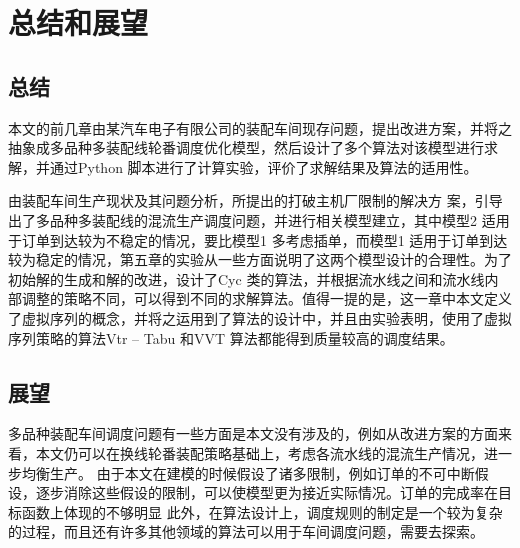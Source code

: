 \chapter{总结和展望}

\section{总结}
本文的前几章由某汽车电子有限公司的装配车间现存问题，提出改进方案，并将之抽象成多品种多装配线轮番调度优化模型，然后设计了多个算法对该模型进行求解，并通过Python 脚本进行了计算实验，评价了求解结果及算法的适用性。

由装配车间生产现状及其问题分析，所提出的打破主机厂限制的解决方
案，引导出了多品种多装配线的混流生产调度问题，并进行相关模型建立，其中模型2 适用于订单到达较为不稳定的情况，要比模型1 多考虑插单，而模型1 适用于订单到达较为稳定的情况，第五章的实验从一些方面说明了这两个模型设计的合理性。为了初始解的生成和解的改进，设计了Cyc 类的算法，并根据流水线之间和流水线内部调整的策略不同，可以得到不同的求解算法。值得一提的是，这一章中本文定义了虚拟序列的概念，并将之运用到了算法的设计中，并且由实验表明，使用了虚拟序列策略的算法Vtr -- Tabu 和VVT 算法都能得到质量较高的调度结果。
\section{展望}
多品种装配车间调度问题有一些方面是本文没有涉及的，例如从改进方案的方面来看，本文仍可以在换线轮番装配策略基础上，考虑各流水线的混流生产情况，进一步均衡生产。
由于本文在建模的时候假设了诸多限制，例如订单的不可中断假设，逐步消除这些假设的限制，可以使模型更为接近实际情况。订单的完成率在目标函数上体现的不够明显
此外，在算法设计上，调度规则的制定是一个较为复杂的过程，而且还有许多其他领域的算法可以用于车间调度问题，需要去探索。